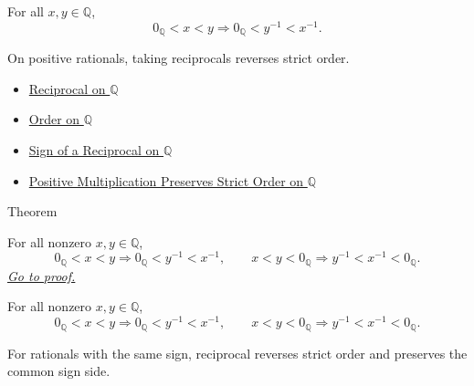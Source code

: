 \begin{remark*}
For all $x,y\in\mathbb{Q}$,
\[
0_{\mathbb{Q}}<x<y
\Longrightarrow
0_{\mathbb{Q}}<y^{-1}<x^{-1}.
\]
\end{remark*}

\begin{remark*}[Interpretation]
On positive rationals, taking reciprocals reverses strict order.
\end{remark*}

\begin{dependencies}
\begin{itemize}
  \item \hyperref[def:reciprocal-on-q-classes]{Reciprocal on $\mathbb{Q}$}
  \item \hyperref[def:order-on-q]{Order on $\mathbb{Q}$}
  \item \hyperref[thm:sign-of-reciprocal-q]{Sign of a Reciprocal on $\mathbb{Q}$}
  \item \hyperref[thm:positive-multiplication-preserves-strict-order-on-q]{Positive Multiplication Preserves Strict Order on $\mathbb{Q}$}
\end{itemize}
\end{dependencies}

\begin{theorembox}{Theorem}
\begin{theorem}
\label{thm:reciprocal-reverses-order-on-same-sign-q}
For all nonzero $x,y\in\mathbb{Q}$,
\[
0_{\mathbb{Q}}<x<y
\Longrightarrow
0_{\mathbb{Q}}<y^{-1}<x^{-1},
\qquad
x<y<0_{\mathbb{Q}}
\Longrightarrow
y^{-1}<x^{-1}<0_{\mathbb{Q}}.
\]
\hyperref[prf:reciprocal-reverses-order-on-same-sign-q]{\textit{Go to proof.}}
\end{theorem}
\end{theorembox}

\begin{remark*}
For all nonzero $x,y\in\mathbb{Q}$,
\[
0_{\mathbb{Q}}<x<y
\Longrightarrow
0_{\mathbb{Q}}<y^{-1}<x^{-1},
\qquad
x<y<0_{\mathbb{Q}}
\Longrightarrow
y^{-1}<x^{-1}<0_{\mathbb{Q}}.
\]
\end{remark*}

\begin{remark*}[Interpretation]
For rationals with the same sign, reciprocal reverses strict order and
preserves the common sign side.
\end{remark*}

